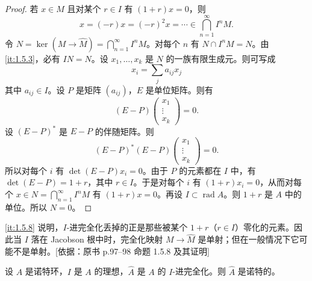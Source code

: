 \begin{proof}
若 $x\in M$ 且对某个 $r\in I$ 有 $(1+r)x=0$，则
\[
x=(-r)x=(-r)^2x=\cdots\in\bigcap_{n=1}^{\infty}I^nM.
\]
令 $N=\ker(M\to\widehat M)=\bigcap_{n=1}^{\infty}I^nM$。对每个 $n$ 有 $N\cap I^nM=N$。由 \ref{it:1.5.3}，必有 $IN=N$。设 $x_1,\dots,x_k$ 是 $N$ 的一族有限生成元。则可写成
\[
x_i=\sum_j a_{ij}x_j
\]
其中 $a_{ij}\in I$。设 $P$ 是矩阵 $(a_{ij})$，$E$ 是单位矩阵。则有
\[
(E-P)\begin{pmatrix}x_1\\ \vdots\\ x_k\end{pmatrix}=0.
\]
设 $(E-P)^*$ 是 $E-P$ 的伴随矩阵。则
\[
(E-P)^*(E-P)\begin{pmatrix}x_1\\ \vdots\\ x_k\end{pmatrix}=0.
\]
所以对每个 $i$ 有 $\det(E-P)x_i=0$。由于 $P$ 的元素都在 $I$ 中，有 $\det(E-P)=1+r$，其中 $r\in I$。于是对每个 $i$ 有 $(1+r)x_i=0$，从而对每个 $x\in N=\bigcap_{n=1}^{\infty}I^nM$ 有 $(1+r)x=0$。再设 $I\subset\operatorname{rad}A$。则 $1+r$ 是 $A$ 中的单位。所以 $N=0$。
\end{proof}
\begin{tnote}
\ref{it:1.5.8} 说明，$I$-进完全化丢掉的正是那些被某个 $1+r$（$r\in I$）零化的元素。因此当 $I$ 落在 Jacobson 根中时，完全化映射 $M\to\widehat M$ 是单射；但在一般情况下它可能不是单射。[依据：原书 p.97–98 命题 1.5.8 及其证明]
\end{tnote}

\begin{proposition}\label{it:1.5.9}
设 $A$ 是诺特环，$I$ 是 $A$ 的理想，$\widehat A$ 是 $A$ 的 $I$-进完全化。则 $\widehat A$ 是诺特的。
\end{proposition}

